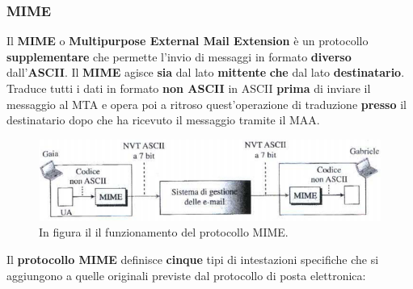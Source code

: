 \documentclass[11pt,a4paper,oneside]{book}
\theoremstyle{definition}
\begin{document}
\subsubsection{MIME}
Il \textbf{MIME} o \textbf{Multipurpose External Mail Extension} è un protocollo \textbf{supplementare} che permette l'invio di messaggi in formato \textbf{diverso} dall'\textbf{ASCII}. Il \textbf{MIME} agisce \textbf{sia} dal lato \textbf{mittente} \textbf{che} dal lato \textbf{destinatario}. Traduce tutti i dati in formato \textbf{non ASCII} in ASCII \textbf{prima} di inviare il messaggio al MTA e opera poi a ritroso quest'operazione di traduzione \textbf{presso} il destinatario dopo che ha ricevuto il messaggio tramite il MAA.
\begin{figure}[!h]
	\includegraphics[scale=0.55]{Immagini/MIME.png}
	\centering
	\caption{In figura il il funzionamento del protocollo MIME.}
\end{figure}\newline
Il \textbf{protocollo MIME} definisce \textbf{cinque} tipi di intestazioni specifiche che si aggiungono a quelle originali previste dal protocollo di posta elettronica:
\end{document}
